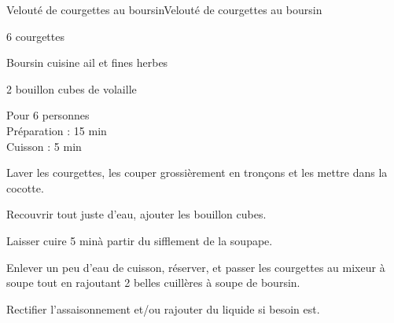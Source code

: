 \begin{recette}{Velouté de courgettes au boursin}{Velouté de courgettes au boursin}

\begin{ingredients}
6 courgettes\par
Boursin cuisine ail et fines herbes\par
2 bouillon cubes de volaille\par
\end{ingredients}

\begin{infos}
Pour 6 personnes\\
Préparation : 15 min\\
Cuisson : 5 min\\
\end{infos}

\begin{etapes}
\item Laver les courgettes, les couper grossièrement en tronçons et les mettre dans la cocotte.
\item Recouvrir tout juste d’eau, ajouter les bouillon cubes.
\item Laisser cuire 5 minà partir du sifflement de la soupape.
\item Enlever un peu d'eau de cuisson, réserver, et passer les courgettes au mixeur à soupe tout en rajoutant 2 belles cuillères à soupe de boursin.
\item Rectifier l'assaisonnement et/ou rajouter du liquide si besoin est.
\end{etapes}

\end{recette}